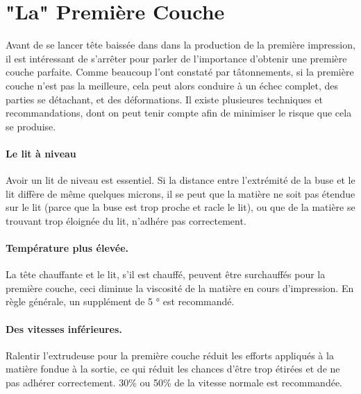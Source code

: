 
\section{"La" Première Couche}
\label{sec:the_important_first_layer}

Avant de se lancer tête baissée dans dans la production de la première impression, il est intéressant de s'arrêter pour parler de l'importance d'obtenir une première couche parfaite. Comme beaucoup l'ont constaté par tâtonnements, si la première couche n'est pas la meilleure, cela peut alors conduire à un échec complet, des parties se détachant, et des déformations. Il existe plusieures techniques et recommandations, dont on peut tenir compte afin de minimiser le risque que cela se produise.

\paragraph{Le lit à niveau} %
\label{par:level_bed}
Avoir un lit de niveau est essentiel. Si la distance entre l'extrémité de la buse et le lit diffère de même quelques microns, il se peut que la matière ne soit pas étendue sur le lit (parce que la buse est trop proche et racle le lit), ou que de la matière se trouvant trop éloignée du lit, n'adhére pas correctement.

\paragraph{Température plus élevée.} %
\label{par:higher_temperature}
La tête chauffante et le lit, s'il est chauffé, peuvent être surchauffés pour la première couche, ceci diminue la viscosité de la matière en cours d'impression.  En règle générale, un supplément de 5 ° est recommandé.

\paragraph{Des vitesses inférieures.} %
\label{par:lower_speeds}
Ralentir l'extrudeuse pour la première couche réduit les efforts appliqués à la matière fondue à la sortie, ce qui réduit les chances d'être trop étirées et de ne pas adhérer correctement. 30\% ou 50\% de la vitesse normale est recommandée.

